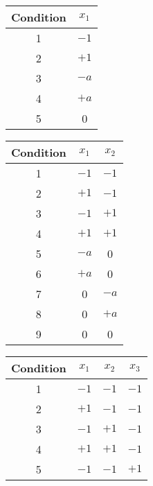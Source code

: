 \begin{itemize}
\begin{table}[!htbp]
              \begin{tabular}{cc}
                  \toprule Condition & $x_{1}$ \\
                  \midrule 1         & $-1$    \\
                  2                  & $+1$    \\
                  3                  & $-a$    \\
                  4                  & $+a$    \\
                  5                  & 0       \\
                  \bottomrule
              \end{tabular}\hfill
              \begin{tabular}{ccc}
                  \toprule Condition & $x_{1}$ & $x_{2}$ \\
                  \midrule 1         & $-1$    & $-1$    \\
                  2                  & $+1$    & $-1$    \\
                  3                  & $-1$    & $+1$    \\
                  4                  & $+1$    & $+1$    \\
                  5                  & $-a$    & 0       \\
                  6                  & $+a$    & 0       \\
                  7                  & 0       & $-a$    \\
                  8                  & 0       & $+a$    \\
                  9                  & 0       & 0       \\
                  \bottomrule
              \end{tabular}\hfill
              \begin{tabular}{cccc}
                  \toprule Condition & $x_{1}$ & $x_{2}$ & $x_{3}$ \\
                  \midrule 1         & $-1$    & $-1$    & $-1$    \\
                  2                  & $+1$    & $-1$    & $-1$    \\
                  3                  & $-1$    & $+1$    & $-1$    \\
                  4                  & $+1$    & $+1$    & $-1$    \\
                  5                  & $-1$    & $-1$    & $+1$    \\

\end{tabular}
\end{table}
\end{itemize}

